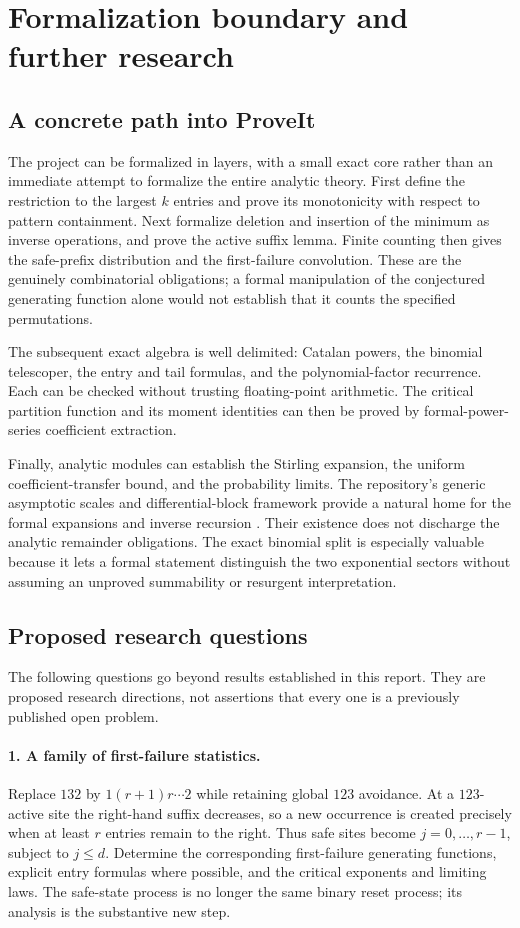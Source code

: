 \documentclass[11pt]{article}
\numberwithin{equation}{section}
\theoremstyle{definition}
\begin{document}
\section{Formalization boundary and further research}\label{fpf:sec:formal}

\subsection{A concrete path into ProveIt}
The project can be formalized in layers, with a small exact core rather
than an immediate attempt to formalize the entire analytic theory.
First define the restriction to the largest $k$ entries and prove its
monotonicity with respect to pattern containment. Next formalize deletion
and insertion of the minimum as inverse operations, and prove the active
suffix lemma. Finite counting then gives the safe-prefix distribution and
the first-failure convolution. These are the genuinely combinatorial
obligations; a formal manipulation of the conjectured generating function
alone would not establish that it counts the specified permutations.

The subsequent exact algebra is well delimited: Catalan powers, the
binomial telescoper, the entry and tail formulas, and the polynomial-factor
recurrence. Each can be checked without trusting floating-point arithmetic.
The critical partition function and its moment identities can then be
proved by formal-power-series coefficient extraction.

Finally, analytic modules can establish the Stirling expansion, the
uniform coefficient-transfer bound, and the probability limits. The
repository's generic asymptotic scales and differential-block framework
provide a natural home for the formal expansions and inverse recursion
\cite{proveit}. Their existence does not discharge the analytic remainder
obligations. The exact binomial split is especially valuable because it
lets a formal statement distinguish the two exponential sectors without
assuming an unproved summability or resurgent interpretation.

\subsection{Proposed research questions}
The following questions go beyond results established in this report.
They are proposed research directions, not assertions that every one is a
previously published open problem.

\paragraph{1. A family of first-failure statistics.}
Replace $132$ by $1(r+1)r\cdots2$ while retaining global $123$ avoidance.
At a $123$-active site the right-hand suffix decreases, so a new occurrence
is created precisely when at least $r$ entries remain to the right. Thus
safe sites become $j=0,\ldots,r-1$, subject to $j\le d$.
Determine the corresponding first-failure generating functions, explicit
entry formulas where possible, and the critical exponents and limiting
laws. The safe-state process is no longer the same binary reset process;
its analysis is the substantive new step.
\end{document}
